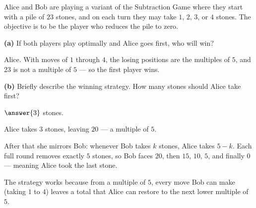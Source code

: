 \documentclass[12pt]{ximera}
\begin{document}
\begin{problem}
Alice and Bob are playing a variant of the Subtraction Game where they start with a
pile of $23$ stones, and on each turn they may take $1$, $2$, $3$, or $4$ stones. The
objective is to be the player who reduces the pile to zero.

\begin{prompt}
\textbf{(a)} If both players play optimally and Alice goes first, who will win?

\begin{multipleChoice}
\end{multipleChoice}

\begin{feedback}
Alice. With moves of $1$ through $4$, the losing positions are the multiples of $5$,
and $23$ is not a multiple of $5$ --- so the first player wins.
\end{feedback}
\end{prompt}

\begin{prompt}
\textbf{(b)} Briefly describe the winning strategy. How many stones should Alice take
first?

$\answer{3}$ stones.

\begin{feedback}
Alice takes $3$ stones, leaving $20$ --- a multiple of $5$.

After that she mirrors Bob: whenever Bob takes $k$ stones, Alice takes $5-k$. Each
full round removes exactly $5$ stones, so Bob faces $20$, then $15$, $10$, $5$, and
finally $0$ --- meaning Alice took the last stone.

The strategy works because from a multiple of $5$, every move Bob can make (taking $1$
to $4$) leaves a total that Alice can restore to the next lower multiple of $5$.
\end{feedback}
\end{prompt}
\end{problem}
\end{document}

